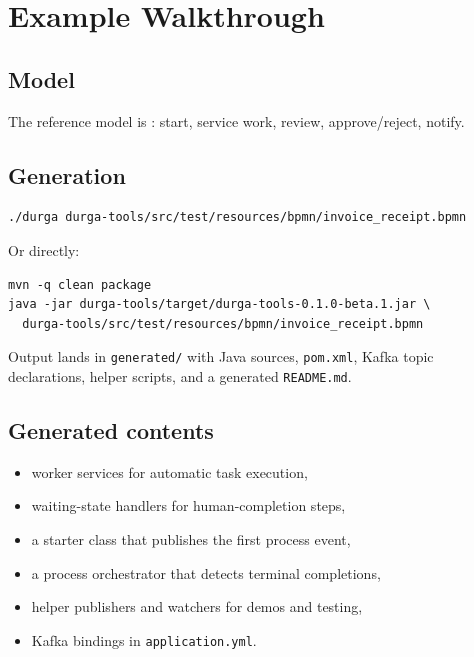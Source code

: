 \section{Example Walkthrough}
\label{sec:GeneratedProjectsExample}

\subsection{Model}

The reference model is :
start, service work, review, approve/reject, notify.

\subsection{Generation}

\begin{verbatim}
./durga durga-tools/src/test/resources/bpmn/invoice_receipt.bpmn
\end{verbatim}

Or directly:

\begin{verbatim}
mvn -q clean package
java -jar durga-tools/target/durga-tools-0.1.0-beta.1.jar \
  durga-tools/src/test/resources/bpmn/invoice_receipt.bpmn
\end{verbatim}

Output lands in \texttt{generated/} with Java sources, \texttt{pom.xml},
Kafka topic declarations, helper scripts, and a generated \texttt{README.md}.

\subsection{Generated contents}

\begin{itemize}
\item worker services for automatic task execution,
\item waiting-state handlers for human-completion steps,
\item a starter class that publishes the first process event,
\item a process orchestrator that detects terminal completions,
\item helper publishers and watchers for demos and testing,
\item Kafka bindings in \texttt{application.yml}.
\end{itemize}

